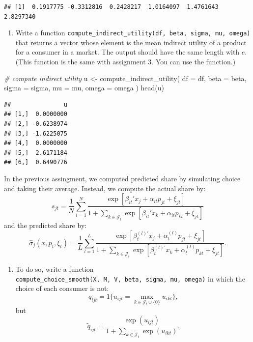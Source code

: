 \documentclass[
]{book}
\newenvironment{Shaded}{\begin{snugshade}}{\end{snugshade}}
\newcommand{\AttributeTok}[1]{\textcolor[rgb]{0.77,0.63,0.00}{#1}}
\newcommand{\CommentTok}[1]{\textcolor[rgb]{0.56,0.35,0.01}{\textit{#1}}}
\newcommand{\FunctionTok}[1]{\textcolor[rgb]{0.00,0.00,0.00}{#1}}
\newcommand{\NormalTok}[1]{#1}
\newcommand{\OtherTok}[1]{\textcolor[rgb]{0.56,0.35,0.01}{#1}}
\providecommand{\tightlist}{%
  \setlength{\itemsep}{0pt}\setlength{\parskip}{0pt}}
\begin{document}
\begin{verbatim}
## [1]  0.1917775 -0.3312816  0.2428217  1.0164097  1.4761643  2.8297340
\end{verbatim}

\begin{enumerate}
\def\labelenumi{\arabic{enumi}.}
\setcounter{enumi}{6}
\tightlist
\item
  Write a function \texttt{compute\_indirect\_utility(df,\ beta,\ sigma,\ mu,\ omega)} that returns a vector whose element is the mean indirect utility of a product for a consumer in a market. The output should have the same length with \(e\). (This function is the same with assignment 3. You can use the function.)
\end{enumerate}

\begin{Shaded}
\begin{Highlighting}[]
\CommentTok{\# compute indirect utility}
\NormalTok{u }\OtherTok{\textless{}{-}} 
  \FunctionTok{compute\_indirect\_utility}\NormalTok{(}
    \AttributeTok{df =}\NormalTok{ df, }
    \AttributeTok{beta =}\NormalTok{ beta, }
    \AttributeTok{sigma =}\NormalTok{ sigma, }
    \AttributeTok{mu =}\NormalTok{ mu, }
    \AttributeTok{omega =}\NormalTok{ omega}
\NormalTok{    )}
\FunctionTok{head}\NormalTok{(u)}
\end{Highlighting}
\end{Shaded}

\begin{verbatim}
##               u
## [1,]  0.0000000
## [2,] -0.6238974
## [3,] -1.6225075
## [4,]  0.0000000
## [5,]  2.6171184
## [6,]  0.6490776
\end{verbatim}

In the previous assingment, we computed predicted share by simulating choice and taking their average. Instead, we compute the actual share by:
\[
s_{jt} = \frac{1}{N} \sum_{i = 1}^N \frac{\exp[\beta_{it}' x_j + \alpha_{it} p_{jt} + \xi_{jt}]}{1 + \sum_{k \in \mathcal{J}_t} \exp[\beta_{it}' x_k + \alpha_{it} p_{kt} + \xi_{jt}]}
\]
and the predicted share by:
\[
\widehat{\sigma}_{j}(x, p_t, \xi_t) = \frac{1}{L} \sum_{l = 1}^L \frac{\exp[\beta_{t}^{(l)\prime} x_j + \alpha_{t}^{(l)} p_{jt} + \xi_{jt}]}{1 + \sum_{k \in \mathcal{J}_t} \exp[\beta_{t}^{(l)\prime} x_k + \alpha_{t}^{(l)} p_{kt} + \xi_{jt}]}.
\]

\begin{enumerate}
\def\labelenumi{\arabic{enumi}.}
\setcounter{enumi}{7}
\tightlist
\item
  To do so, write a function \texttt{compute\_choice\_smooth(X,\ M,\ V,\ beta,\ sigma,\ mu,\ omega)} in which the choice of each consumer is not:
  \[
  q_{ijt} = 1\{u_{ijt} = \max_{k \in \mathcal{J}_t \cup \{0\}} u_{ikt}\},
  \]
  but
  \[
  \tilde{q}_{ijt} = \frac{\exp(u_{ijt})}{1 + \sum_{k \in \mathcal{J}_t} \exp(u_{ikt})}.
  \]
\end{enumerate}
\end{document}
